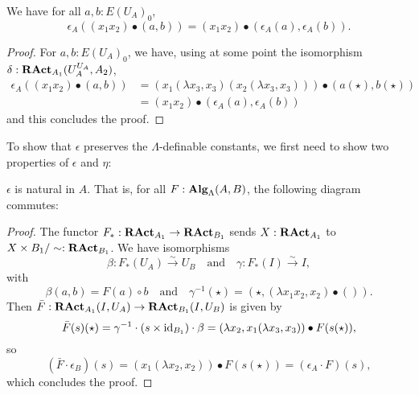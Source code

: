 \begin{lemma}
  We have for all $ a, b: E(U_A)_0 $,
  \[ \epsilon_A((x_1 x_2) \bullet (a, b)) = (x_1 x_2) \bullet (\epsilon_A(a), \epsilon_A(b)). \]
\end{lemma}
\begin{proof}
  For $ a, b: E(U_A)_0 $, we have, using at some point the isomorphism $ \delta: \mathbf{RAct}_{A_1}(U_A^{U_A}, A_2) $,
  \begin{align*}
    \epsilon_A((x_1 x_2) \bullet (a, b)) &= (x_1 (\lambda x_3, x_3) (x_2 (\lambda x_3, x_3))) \bullet (a(\star), b(\star))\\
    &= (x_1 x_2) \bullet (\epsilon_A(a), \epsilon_A(b))
  \end{align*}
  and this concludes the proof.
\end{proof}

To show that $ \epsilon $ preserves the $ \Lambda $-definable constants, we first need to show two properties of $ \epsilon $ and $ \eta $:
\begin{lemma}\label{lem:counit-natural}
  $ \epsilon $ is natural in $ A $. That is, for all $ F: \mathbf{Alg}_{\Lambda}(A, B) $, the following diagram commutes:
  \begin{center}
  \end{center}
\end{lemma}
\begin{proof}
  The functor $ F_* : \mathbf{RAct}_{A_1} \to \mathbf{RAct}_{B_1} $ sends $ X : \mathbf{RAct}_{A_1} $ to $ X \times B_1 / \sim : \mathbf{RAct}_{B_1} $. We have isomorphisms
  \[ \beta: F_*(U_A) \xrightarrow \sim U_B \quad \text{and} \quad \gamma: F_*(I) \xrightarrow \sim I, \]
  with
  \[ \beta(a, b) = F(a) \circ b \quad \text{and} \quad \gamma^{-1}(\star) = (\star, (\lambda x_1 x_2, x_2) \bullet ()). \]
  Then $ \bar F: \mathbf{RAct}_{A_1}(I, U_A) \to \mathbf{RAct}_{B_1}(I, U_B) $ is given by
  \[
    \bar F(s)(\star)
    = \gamma^{-1} \cdot (s \times \text{id}_{B_1}) \cdot \beta
    = (\lambda x_2, x_1 (\lambda x_3, x_3)) \bullet F(s(\star)),
  \]
  so
  \[
    (\bar F \cdot \epsilon_B)(s)
    = (x_1 (\lambda x_2, x_2)) \bullet F(s(\star))
    = (\epsilon_A \cdot F)(s),
  \]
  which concludes the proof.
\end{proof}

